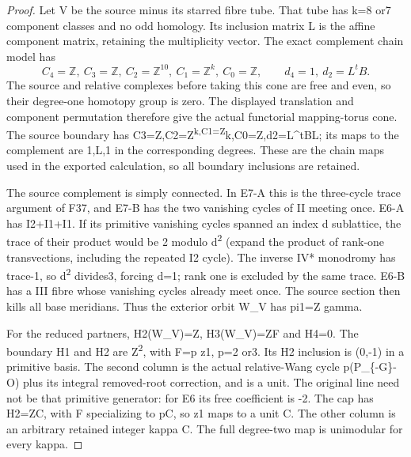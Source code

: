 \begin{proof}
Let V be the source minus its starred fibre tube. That tube has
k=8 or7 component classes and no odd homology. Its inclusion
matrix L is the affine component matrix, retaining the multiplicity
vector. The exact complement chain model has
\[
 C_4=\mathbb Z,\ C_3=\mathbb Z,\ C_2=\mathbb Z^{10},\
 C_1=\mathbb Z^k,\ C_0=\mathbb Z,\qquad
 d_4=1,\ d_2=L^tB.
\]
The source and relative complexes before taking this cone are
free and even, so their degree-one homotopy group is zero.
The displayed translation and component permutation therefore
give the actual functorial mapping-torus cone. The source boundary
has C3=Z,C2=Z\textsuperscript{k,C1=Z}k,C0=Z,d2=L\^{}tBL; its maps to the complement
are 1,L,1 in the corresponding degrees. These are the chain maps
used in the exported calculation, so all boundary inclusions are
retained.

The source complement is simply connected. In E7-A this is the
three-cycle trace argument of F37, and E7-B has the two vanishing
cycles of II meeting once. E6-A has I2+I1+I1. If its primitive
vanishing cycles spanned an index d sublattice, the trace of their
product would be 2 modulo d\textsuperscript{2} (expand the product of rank-one
transvections, including the repeated I2 cycle). The inverse IV*
monodromy has trace-1, so d\textsuperscript{2} divides3, forcing d=1; rank one is
excluded by the same trace. E6-B has a III fibre whose vanishing
cycles already meet once. The source section then kills all base
meridians. Thus the exterior orbit W\_V has pi1=Z gamma.

For the reduced partners, H2(W\_V)=Z, H3(W\_V)=ZF and H4=0.
The boundary H1 and H2 are Z\textsuperscript{2}, with F=p z1, p=2 or3.
Its H2 inclusion is (0,-1) in a primitive basis. The second
column is the actual relative-Wang cycle
p(P\_\{-G\}-O) plus its integral removed-root correction, and is
a unit. The original line need not be that primitive generator:
for E6 its free coefficient is -2. The cap has H2=ZC, with
F specializing to pC, so z1 maps to a unit C. The other column
is an arbitrary retained integer kappa C. The full degree-two
map is unimodular for every kappa.


\end{proof}
